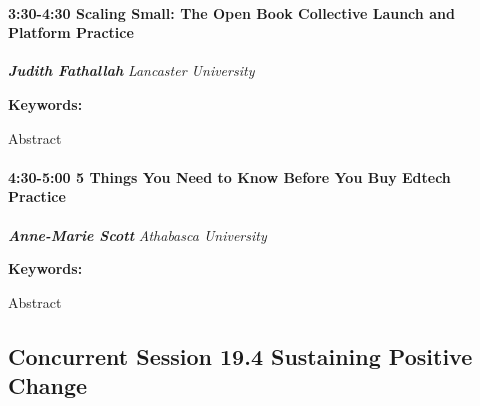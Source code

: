 \documentclass[
]{book}
\begin{document}
\begin{session}
\hypertarget{scaling-small-the-open-book-collective-launch-and-platform-practice}{%
\paragraph*{\texorpdfstring{3:30-4:30 \textbar{} \textbf{Scaling Small:
The Open Book Collective Launch and Platform} \textbar{}
Practice}{3:30-4:30 \textbar{} Scaling Small: The Open Book Collective Launch and Platform \textbar{} Practice}}\label{scaling-small-the-open-book-collective-launch-and-platform-practice}}

\textbf{\emph{Judith Fathallah}} \textbar{} \emph{Lancaster University}

\textbf{Keywords:}

Abstract
\end{session}

\begin{session}
\hypertarget{things-you-need-to-know-before-you-buy-edtech-practice}{%
\paragraph*{\texorpdfstring{4:30-5:00 \textbar{} \textbf{5 Things You
Need to Know Before You Buy Edtech} \textbar{}
Practice}{4:30-5:00 \textbar{} 5 Things You Need to Know Before You Buy Edtech \textbar{} Practice}}\label{things-you-need-to-know-before-you-buy-edtech-practice}}

\textbf{\emph{Anne-Marie Scott}} \textbar{} \emph{Athabasca University}

\textbf{Keywords:}

Abstract
\end{session}

\hypertarget{concurrent-session-19.4-sustaining-positive-change}{%
\subsection*{Concurrent Session 19.4 \textbar{} Sustaining Positive Change}\label{concurrent-session-19.4-sustaining-positive-change}}
\end{document}
